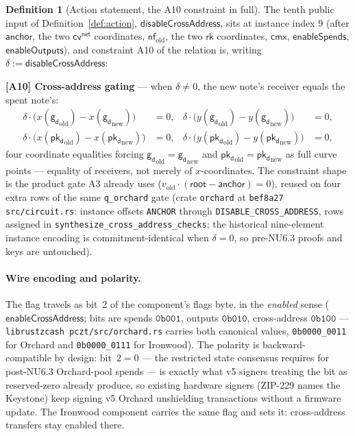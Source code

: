 \documentclass[11pt,a4paper]{article}
\theoremstyle{definition}
\newtheorem{definition}[theorem]{Definition}
\newcommand{\nfsym}{\mathsf{nf}}
\newcommand{\cmx}{\mathsf{cmx}}
\newcommand{\cvsym}{\mathsf{cv}}
\newcommand{\rk}{\mathsf{rk}}
\newcommand{\pkd}{\ensuremath{\mathsf{pk_d}}}
\newcommand{\gd}{\ensuremath{\mathsf{g_d}}}
\begin{document}
\begin{definition}[Action statement, the A10 constraint in full]\label{def:iw-action}
The tenth public input of Definition~\ref{def:action},
$\mathsf{disableCrossAddress}$, sits at instance index $9$ (after
$\mathsf{anchor}$, the two $\cvsym^{\mathsf{net}}$ coordinates,
$\nfsym_{\mathrm{old}}$, the two $\rk$ coordinates, $\cmx$,
$\mathsf{enableSpends}$, $\mathsf{enableOutputs}$), and constraint A10 of
the relation is, writing $\delta := \mathsf{disableCrossAddress}$:

\medskip\noindent
\textbf{[A10] Cross-address gating} --- when $\delta \ne 0$, the new note's
receiver equals the spent note's:
\begin{align*}
\delta \cdot \bigl(x(\gd_{\mathrm{old}}) - x(\gd_{\mathrm{new}})\bigr) &= 0,
&
\delta \cdot \bigl(y(\gd_{\mathrm{old}}) - y(\gd_{\mathrm{new}})\bigr) &= 0,
\\
\delta \cdot \bigl(x(\pkd_{\mathrm{old}}) - x(\pkd_{\mathrm{new}})\bigr) &=
0, &
\delta \cdot \bigl(y(\pkd_{\mathrm{old}}) - y(\pkd_{\mathrm{new}})\bigr) &=
0,
\end{align*}
four coordinate equalities forcing $\gd_{\mathrm{old}} = \gd_{\mathrm{new}}$
and $\pkd_{\mathrm{old}} = \pkd_{\mathrm{new}}$ as full curve points ---
equality of receivers, not merely of $x$-coordinates. The constraint shape
is the product gate A3 already uses ($v_{\mathrm{old}} \cdot (\mathsf{root}
- \mathsf{anchor}) = 0$), reused on four extra rows of the same
\texttt{q\_orchard} gate (crate \texttt{orchard} at \texttt{bef8a27}
\texttt{src/circuit.rs}: instance offsets \texttt{ANCHOR} through
\texttt{DISABLE\_CROSS\_ADDRESS}, rows assigned in
\texttt{synthesize\_cross\_address\_checks}; the historical nine-element
instance encoding is commitment-identical when $\delta = 0$, so pre-NU6.3
proofs and keys are untouched).
\end{definition}

\paragraph{Wire encoding and polarity.} The flag travels as bit~2 of the
component's flags byte, in the \emph{enabled} sense
($\mathsf{enableCrossAddress}$; bits are spends $\mathtt{0b001}$, outputs
$\mathtt{0b010}$, cross-address $\mathtt{0b100}$ --- \texttt{librustzcash
pczt/src/orchard.rs} carries both canonical values,
\texttt{0b0000\_0011} for Orchard and \texttt{0b0000\_0111} for
Ironwood). The polarity is backward-compatible by design: bit~$2 = 0$ ---
the restricted state consensus requires for post-NU6.3 Orchard-pool spends
--- is exactly what v5 signers treating the bit as reserved-zero already
produce, so existing hardware signers (ZIP-229 names the Keystone) keep
signing v5 Orchard unshielding transactions without a firmware update. The
Ironwood component carries the same flag and sets it: cross-address
transfers stay enabled there.
\end{document}
